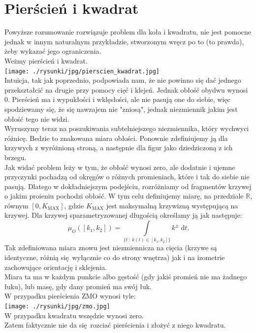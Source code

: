 \documentclass[a4paper, 12pt]{article}
\newcommand{\rysunek}[1]{\hfill \break\\[16pt] \Huge \textbf{\textcolor{violet}{Brakujący rysunek \normalsize
#1}} \hfill
\break \\[16pt] \normalsize}
\begin{document}
\section{Pierścień i kwadrat}\label{ZMO}
Powyższe rozumowanie rozwiązuje problem dla koła i kwadratu, nie jest pomocne jednak w innym naturalnym
przykładzie, stworzonym wręcz po to (to prawda), żeby wykazać jego ograniczenia. \\
Weżmy pierścień i kwadrat. \\
\texttt{[image: ./rysunki/jpg/pierscien\_kwadrat.jpg]} \\
Intuicja, tak jak poprzednio, podpowiada nam, że nie powinno się dać jednego przekształcić na drugie
przy pomocy cięć i klejeń. Jednak obłość obydwu wynosi $0$.
Pierścień ma i wypukłości i wklęsłości, ale nie pasują one do siebie, więc spodziewamy się, że się nawzajem
nie "zniosą", jednak niezmiennik jakim jest obłość tego nie widzi. \\
Wyruszymy teraz na poszukiwania subtelniejszego niezmiennika, który wychwyci różnicę. Bedzie to
znakowana miara obłości. Ponownie zdefiniujemy ją dla krzywych z wyróżnioną stroną, a następnie
dla figur jako dziedziczoną z ich brzegu. \\
Jak widać problem leży w tym, że obłość wynosi zero, ale dodatnie i ujemne przyczynki pochadzą od okręgów
o różnych promieniach, które i tak do siebie nie pasują. Dlatego w dokładniejszym podejściu, rozróżniamy
od fragmentów krzywej o jakim proieniu pochodzi obłość. W tym celu definiujemy miarę, na przedziale
$\mathbb{R}$, równym $[0, K_\text{MAX}]$, gdzie $K_\text{MAX}$ jest maksymalną krzywizną występującą na
krzywej. Dla krzywej sparametryzowanej długością określamy ją jak następuje:
\begin{equation}
    \mu_O([k_1, k_2]) = \displaystyle\int\limits_{\{t\ :\ k(t) \in [k_1, k_2]\}}
    k^\pm\ \textrm{d}t.
\end{equation}
Tak zdefiniowana miara znowu jest niezmiennicza na cięcia (krzywe są identyczne, różnią się wyłącznie co do
strony wnętrza) jak i na izometrie zachowujące orientację i sklejenia. \\
Miara ta ma w każdym punkcie albo gęstość (gdy jakiś promień nie ma żadnego łuku), lub masę, gdy dany promień
 ma swój łuk. \\
 W przypadku pierścienia ZMO wynosi tyle: \\
 \texttt{[image: ./rysunki/jpg/zmo.jpg]} \\
 W przypadku kwadratu wszędzie wynosi zero. \\
 Zatem faktycznie nie da się rozciać pierścienia i złożyć z niego kwadratu. \\
\end{document}
